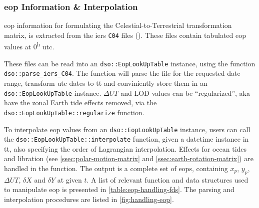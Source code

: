 \subsubsection{\gls{eop} Information \& Interpolation}\label{ssec:eop-interpolation}

\Gls{eop} information for formulating the Celestial-to-Terrestrial transformation 
matrix, is extracted from the \gls{iers} \texttt{C04} files (\cite{Bizouard2019}).
These files contain tabulated \gls{eop} values at 0\textsuperscript{h} \gls{utc}. 

These files can be read into an \texttt{dso::EopLookUpTable} instance, using 
the function \texttt{dso::parse\_iers\_C04}. The function will parse the file 
for the requested date range, transform \gls{utc} dates to \gls{tt} and conviniently 
store them in an \texttt{dso::EopLookUpTable} instance. $\Delta UT$ and LOD values 
can be ``regularized'', aka have the zonal Earth tide effects removed, via the 
\texttt{dso::EopLookUpTable::regularize} function.

To interpolate \gls{eop} values from an \texttt{dso::EopLookUpTable} instance, 
users can call the \texttt{dso::EopLookUpTable::interpolate} function, given 
a datetime instance in \gls{tt}, also specifying the order of Lagrangian 
interpolation. Effects for ocean tides and libration (see \ref{ssec:polar-motion-matrix} 
and \ref{ssec:earth-rotation-matrix}) are handled in the function. The output 
is a complete set of \gls{eop}s, containing $x_p$, $y_p$, $\Delta UT$, $\delta X$ 
and $\delta Y$ at given $t$. A list of relevant function and data structures 
used to manipulate \gls{eop} is presented in \ref{table:eop-handling-fds}. The 
parsing and interpolation procedures are listed in \ref{fig:handling-eop}.

